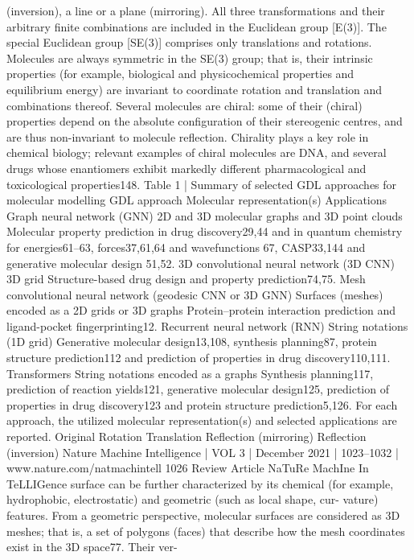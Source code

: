(inversion), a line or a plane (mirroring).
All three transformations and their arbitrary finite
combinations are included in the Euclidean group [E(3)]. The
special Euclidean group [SE(3)] comprises only translations and
rotations.
Molecules are always symmetric in the SE(3) group; that is, their
intrinsic properties (for example, biological and physicochemical
properties and equilibrium energy) are invariant to coordinate
rotation and translation and combinations thereof. Several
molecules are chiral: some of their (chiral) properties depend on
the absolute configuration of their stereogenic centres, and are
thus non-invariant to molecule reflection. Chirality plays a key
role in chemical biology; relevant examples of chiral molecules
are DNA, and several drugs whose enantiomers exhibit markedly
different pharmacological and toxicological properties148.
Table 1 | Summary of selected GDL approaches for molecular
modelling
GDL approach
Molecular
representation(s)
Applications
Graph neural
network (GNN)
2D and 3D molecular
graphs and 3D point
clouds
Molecular property
prediction in drug
discovery29,44 and in
quantum chemistry for
energies61–63, forces37,61,64 and
wavefunctions 67, CASP33,144
and generative molecular
design 51,52.
3D convolutional
neural network
(3D CNN)
3D grid
Structure-based drug design
and property prediction74,75.
Mesh
convolutional
neural network
(geodesic CNN or
3D GNN)
Surfaces (meshes)
encoded as a 2D grids
or 3D graphs
Protein–protein interaction
prediction and ligand-pocket
fingerprinting12.
Recurrent neural
network (RNN)
String notations (1D
grid)
Generative molecular
design13,108, synthesis
planning87, protein structure
prediction112 and prediction
of properties in drug
discovery110,111.
Transformers
String notations
encoded as a graphs
Synthesis planning117,
prediction of reaction
yields121, generative molecular
design125, prediction of
properties in drug discovery123
and protein structure
prediction5,126.
For each approach, the utilized molecular representation(s) and selected applications are reported.
Original
Rotation
Translation
Reflection (mirroring)
Reflection (inversion)
Nature Machine Intelligence | VOL 3 | December 2021 | 1023–1032 | www.nature.com/natmachintell
1026
Review Article
NaTuRe MachIne In TeLLIGence
surface can be further characterized by its chemical (for example,
hydrophobic, electrostatic) and geometric (such as local shape, cur-
vature) features. From a geometric perspective, molecular surfaces
are considered as 3D meshes; that is, a set of polygons (faces) that
describe how the mesh coordinates exist in the 3D space77. Their ver-

